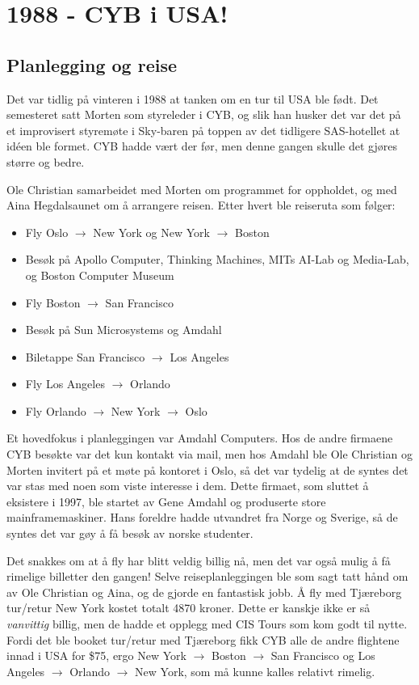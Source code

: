 \chapter{1988 - CYB i USA!}

\author{Av Morten Moen \& Ole Christian Lingjærde}

\section{Planlegging og reise}

Det var tidlig på vinteren i 1988 at tanken om en tur til USA ble født. Det semesteret satt Morten som styreleder i CYB, og slik han husker det var det på et improvisert styremøte i Sky-baren på toppen av det tidligere SAS-hotellet at idéen ble formet. CYB hadde vært der før, men denne gangen skulle det gjøres større og bedre.

Ole Christian samarbeidet med Morten om programmet for oppholdet, og med Aina Hegdalsaunet om å arrangere reisen. Etter hvert ble reiseruta som følger:

\begin{itemize}
	\item Fly Oslo $\to$ New York og New York $\to$ Boston
	\item Besøk på Apollo Computer, Thinking Machines, MITs AI-Lab og Media-Lab, og Boston Computer Museum
	\item Fly Boston $\to$ San Francisco
	\item Besøk på Sun Microsystems og Amdahl
	\item Biletappe San Francisco $\to$ Los Angeles
	\item Fly Los Angeles $\to$ Orlando
	\item Fly Orlando $\to$ New York $\to$ Oslo
\end{itemize}

Et hovedfokus i planleggingen var Amdahl Computers. Hos de andre firmaene CYB besøkte var det kun kontakt via mail, men hos Amdahl ble Ole Christian og Morten invitert på et møte på kontoret i Oslo, så det var tydelig at de syntes det var stas med noen som viste interesse i dem. Dette firmaet, som sluttet å eksistere i 1997, ble startet av Gene Amdahl og produserte store mainframemaskiner. Hans foreldre hadde utvandret fra Norge og Sverige, så de syntes det var gøy å få besøk av norske studenter.

Det snakkes om at å fly har blitt veldig billig nå, men det var også mulig å få rimelige billetter den gangen! Selve reiseplanleggingen ble som sagt tatt hånd om av Ole Christian og Aina, og de gjorde en fantastisk jobb. Å fly med Tjæreborg tur/retur New York kostet totalt 4870 kroner. Dette er kanskje ikke er så \textit{vanvittig} billig, men de hadde et opplegg med CIS Tours som kom godt til nytte. Fordi det ble booket tur/retur med Tjæreborg fikk CYB alle de andre flightene innad i USA for \$75, ergo New York $\to$ Boston $\to$ San Francisco og Los Angeles $\to$ Orlando $\to$ New York, som må kunne kalles relativt rimelig.

